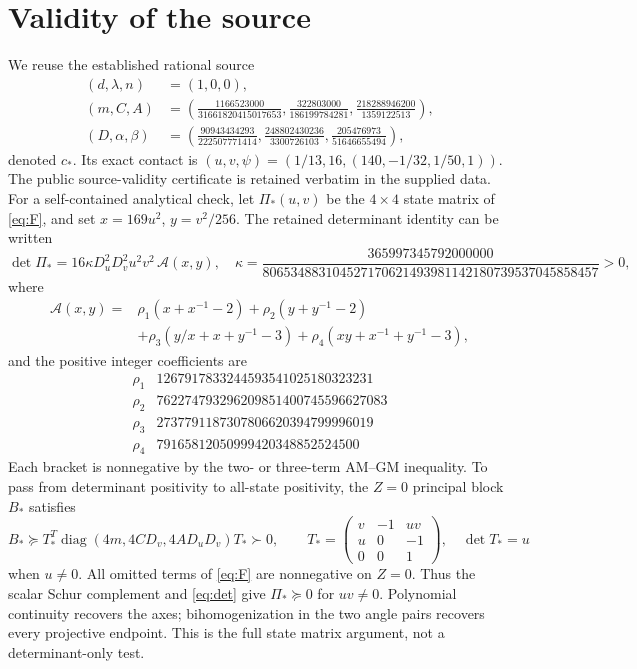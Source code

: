 \documentclass[10pt]{article}
\newcommand{\diag}{\operatorname{diag}}
\begin{document}
\section{Validity of the source}
We reuse the established rational source
\begin{equation}
\begin{aligned}
(d,\lambda,n)&=(1,0,0),\\
(m,C,A)&=\left(\frac{1166523000}{31661820415017653},
\frac{322803000}{186199784281},\frac{218288946200}{1359122513}\right),\\
(D,\alpha,\beta)&=\left(\frac{90943434293}{222507771414},
\frac{248802430236}{3300726103},\frac{205476973}{51646655494}\right),
\end{aligned}                                               \label{eq:cstar}
\end{equation}
denoted $c_*$. Its exact contact is
$(u,v,\psi)=(1/13,16,(140,-1/32,1/50,1))$.
The public source-validity certificate is retained verbatim in the supplied
data. For a self-contained analytical check, let $\Pi_*(u,v)$ be the
$4\times4$ state matrix of \eqref{eq:F}, and set
$x=169u^2$, $y=v^2/256$. The retained determinant identity can be written
\begin{equation}
\det\Pi_*=16\kappa D_u^2D_v^2u^2v^2\,\mathcal A(x,y),
\quad
\kappa=\frac{365997345792000000}
 {806534883104527170621493981142180739537045858457}>0,        \label{eq:det}
\end{equation}
where
\begin{align*}
\mathcal A(x,y)={}&\rho_1(x+x^{-1}-2)+\rho_2(y+y^{-1}-2)\\
&+\rho_3(y/x+x+y^{-1}-3)+\rho_4(xy+x^{-1}+y^{-1}-3),
\end{align*}
and the positive integer coefficients are
\[
\begin{array}{c|r}
\rho_1&1267917833244593541025180323231\\
\rho_2&762274793296209851400745596627083\\
\rho_3&2737791187307806620394799996019\\
\rho_4&79165812050999420348852524500
\end{array}
\]
Each bracket is nonnegative by the two- or three-term AM--GM inequality.
To pass from determinant positivity to all-state positivity, the $Z=0$
principal block $B_*$ satisfies
\begin{equation}
B_*\succeq T_*^T\diag(4m,4CD_v,4AD_uD_v)T_*\succ0,
\qquad
T_* =\begin{pmatrix}v&-1&uv\\u&0&-1\\0&0&1\end{pmatrix},
\quad\det T_*=u                                           \label{eq:transverse}
\end{equation}
when $u\ne0$. All omitted terms of \eqref{eq:F} are nonnegative on $Z=0$.
Thus the scalar Schur complement and \eqref{eq:det} give
$\Pi_*\succeq0$ for $uv\ne0$. Polynomial continuity recovers the axes;
bihomogenization in the two angle pairs recovers every projective endpoint.
This is the full state matrix argument, not a determinant-only test.
\end{document}
